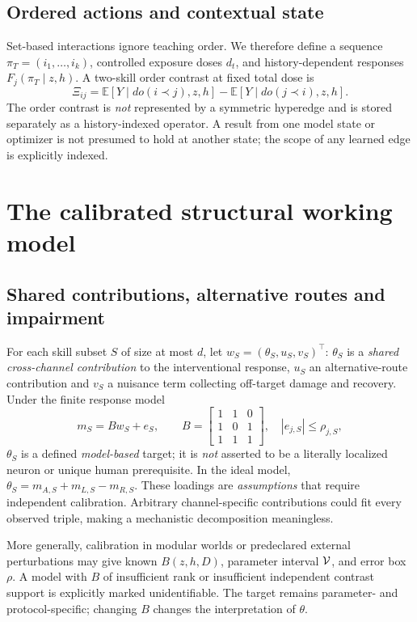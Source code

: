 \documentclass[11pt,a4paper]{article}
\newcommand{\E}{\mathbb{E}}\newcommand{\Prb}{\mathbb{P}}
\theoremstyle{definition}\newtheorem{definition}[theorem]{Definition}
\theoremstyle{remark}\newtheorem{remark}[theorem]{Remark}
\begin{document}
\subsection{Ordered actions and contextual state}
Set-based interactions ignore teaching order. We therefore define a sequence $\pi_T=(i_1,\ldots,i_k)$, controlled exposure doses $d_t$, and history-dependent responses $F_j(\pi_T\mid z,h)$. A two-skill order contrast at fixed total dose is
\begin{equation}\label{eq:order}
 \Xi_{ij}=\E[Y\mid do(i\prec j),z,h]-\E[Y\mid do(j\prec i),z,h].
\end{equation}
The order contrast is \emph{not} represented by a symmetric hyperedge and is stored separately as a history-indexed operator. A result from one model state or optimizer is not presumed to hold at another state; the scope of any learned edge is explicitly indexed.

\section{The calibrated structural working model}\label{sec:model}
\subsection{Shared contributions, alternative routes and impairment}
For each skill subset $S$ of size at most $d$, let $w_S=(\theta_S,u_S,v_S)^\top$: $\theta_S$ is a \emph{shared cross-channel contribution} to the interventional response, $u_S$ an alternative-route contribution and $v_S$ a nuisance term collecting off-target damage and recovery. Under the finite response model
\begin{equation}\label{eq:Bmodel}
 m_S = B w_S+e_S,\qquad
 B=\begin{bmatrix}1&1&0\\1&0&1\\1&1&1\end{bmatrix},\quad |e_{j,S}|\le \rho_{j,S},
\end{equation}
$\theta_S$ is a defined \emph{model-based} target; it is \emph{not} asserted to be a literally localized neuron or unique human prerequisite. In the ideal model, $\theta_S=m_{A,S}+m_{L,S}-m_{R,S}$. These loadings are \emph{assumptions} that require independent calibration. Arbitrary channel-specific contributions could fit every observed triple, making a mechanistic decomposition meaningless.

More generally, calibration in modular worlds or predeclared external perturbations may give known $B(z,h,D)$, parameter interval $\mathcal{V}$, and error box $\rho$. A model with $B$ of insufficient rank or insufficient independent contrast support is explicitly marked unidentifiable. The target remains parameter- and protocol-specific; changing $B$ changes the interpretation of $\theta$.
\end{document}
